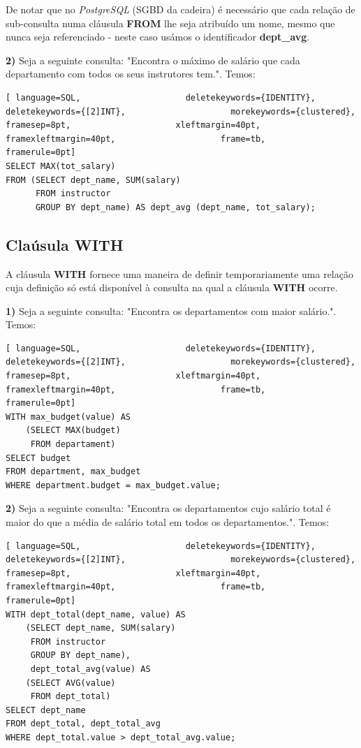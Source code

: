 \documentclass[titlepage]{book}
\theoremstyle{definition}
\begin{document}
De notar que no \textit{PostgreSQL} (SGBD da cadeira) é necessário que cada relação de sub-consulta numa cláusula \textbf{FROM} lhe seja atribuído um nome, mesmo que nunca seja referenciado - neste caso usámos o identificador \textbf{dept\_avg}.

\textbf{2)} Seja a seguinte consulta: "Encontra o máximo de salário que cada departamento com todos os seus instrutores tem.". Temos:
\begin{lstlisting}[ language=SQL,                     deletekeywords={IDENTITY},                     deletekeywords={[2]INT},                     morekeywords={clustered},                     framesep=8pt,                     xleftmargin=40pt,                     framexleftmargin=40pt,                     frame=tb,                     framerule=0pt]
SELECT MAX(tot_salary)
FROM (SELECT dept_name, SUM(salary)
      FROM instructor
      GROUP BY dept_name) AS dept_avg (dept_name, tot_salary);
\end{lstlisting}

\subsection{Claúsula WITH}
A cláusula \textbf{WITH} fornece uma maneira de definir temporariamente uma relação cuja definição só está disponível à consulta na qual a cláusula \textbf{WITH} ocorre.

\textbf{1)} Seja a seguinte consulta: "Encontra os departamentos com maior salário.". Temos:
\begin{lstlisting}[ language=SQL,                     deletekeywords={IDENTITY},                     deletekeywords={[2]INT},                     morekeywords={clustered},                     framesep=8pt,                     xleftmargin=40pt,                     framexleftmargin=40pt,                     frame=tb,                     framerule=0pt]
WITH max_budget(value) AS
    (SELECT MAX(budget)
     FROM departament)
SELECT budget
FROM department, max_budget
WHERE department.budget = max_budget.value;
\end{lstlisting}

\textbf{2)} Seja a seguinte consulta: "Encontra os departamentos cujo salário total é maior do que a média de salário total em todos os departamentos.". Temos:
\begin{lstlisting}[ language=SQL,                     deletekeywords={IDENTITY},                     deletekeywords={[2]INT},                     morekeywords={clustered},                     framesep=8pt,                     xleftmargin=40pt,                     framexleftmargin=40pt,                     frame=tb,                     framerule=0pt]
WITH dept_total(dept_name, value) AS
    (SELECT dept_name, SUM(salary)
     FROM instructor
     GROUP BY dept_name),
     dept_total_avg(value) AS 
    (SELECT AVG(value)
     FROM dept_total)
SELECT dept_name
FROM dept_total, dept_total_avg
WHERE dept_total.value > dept_total_avg.value;
\end{lstlisting}
\end{document}

